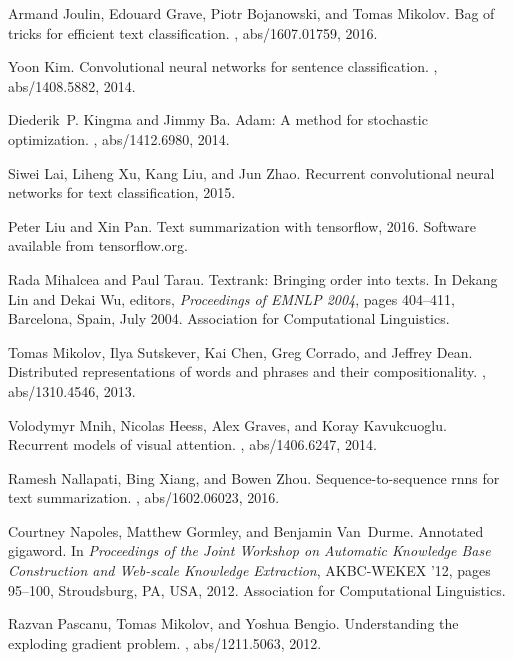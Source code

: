 \documentclass{article}
\begin{document}
\begin{thebibliography}{10}
Armand Joulin, Edouard Grave, Piotr Bojanowski, and Tomas Mikolov.
\newblock Bag of tricks for efficient text classification.
, abs/1607.01759, 2016.

Yoon Kim.
\newblock Convolutional neural networks for sentence classification.
, abs/1408.5882, 2014.

Diederik~P. Kingma and Jimmy Ba.
\newblock Adam: {A} method for stochastic optimization.
, abs/1412.6980, 2014.

Siwei Lai, Liheng Xu, Kang Liu, and Jun Zhao.
\newblock Recurrent convolutional neural networks for text classification,
  2015.

Peter Liu and Xin Pan.
\newblock Text summarization with tensorflow, 2016.
\newblock Software available from tensorflow.org.

Rada Mihalcea and Paul Tarau.
\newblock Textrank: Bringing order into texts.
\newblock In Dekang Lin and Dekai Wu, editors, {\em Proceedings of EMNLP 2004},
  pages 404--411, Barcelona, Spain, July 2004. Association for Computational
  Linguistics.

Tomas Mikolov, Ilya Sutskever, Kai Chen, Greg Corrado, and Jeffrey Dean.
\newblock Distributed representations of words and phrases and their
  compositionality.
, abs/1310.4546, 2013.

Volodymyr Mnih, Nicolas Heess, Alex Graves, and Koray Kavukcuoglu.
\newblock Recurrent models of visual attention.
, abs/1406.6247, 2014.

Ramesh Nallapati, Bing Xiang, and Bowen Zhou.
\newblock Sequence-to-sequence rnns for text summarization.
, abs/1602.06023, 2016.

Courtney Napoles, Matthew Gormley, and Benjamin Van~Durme.
\newblock Annotated gigaword.
\newblock In {\em Proceedings of the Joint Workshop on Automatic Knowledge Base
  Construction and Web-scale Knowledge Extraction}, AKBC-WEKEX '12, pages
  95--100, Stroudsburg, PA, USA, 2012. Association for Computational
  Linguistics.

Razvan Pascanu, Tomas Mikolov, and Yoshua Bengio.
\newblock Understanding the exploding gradient problem.
, abs/1211.5063, 2012.


\end{thebibliography}
\end{document}

